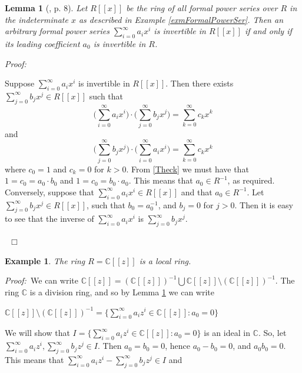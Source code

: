 \documentclass[12pt, oneside]{book}
\newtheorem{lemma}[theorem]{Lemma}
\newtheorem{example}[theorem]{Example}
\newcommand{\proof}{{\noindent \it Proof:~}}
\newcommand{\qed}{\hfill ~$\Box$\\}
\begin{document}
\begin{lemma}[\cite{L1}, p. 8] \label{leadingCoefficient}
\normalfont
\noindent Let $R[[x]]$ be the ring of all formal power series over $R$ in the indeterminate $x$ as
described in Example \ref{exmFormalPowerSer}. Then an arbitrary formal power series 
$\displaystyle \sum_{i = 0}^{\infty} a_ix^i$ is invertible in $R[[x]]$ if and only if its 
leading coefficient $a_0$ is invertible in $R$. 
\end{lemma}

\proof \space  

\noindent Suppose $\displaystyle \sum_{i = 0}^{\infty} a_ix^i$ is invertible in $R[[x]]$. 
Then there exists $\displaystyle \sum_{j = 0}^{\infty} b_jx^j \in R[[x]]$ such that 
\begin{equation} \label{Invertible1}
\big(\displaystyle \sum_{i = 0}^{\infty} a_ix^i\big) \cdot 
\big( \displaystyle \sum_{j = 0}^{\infty} b_jx^j \big) = \displaystyle \sum_{k = 0}^{\infty} c_k x^k
\end{equation}
and
\begin{equation} \label{Invertible2}
\big(\displaystyle \sum_{j = 0}^{\infty} b_jx^j\big) \cdot 
\big( \displaystyle \sum_{i = 0}^{\infty} a_ix^i \big) = \displaystyle \sum_{k = 0}^{\infty} c_k x^k
\end{equation}
where $c_0 = 1$ and $c_k = 0$ for $k > 0.$ From \eqref{Theck} we must have that 
$1 = c_0 = a_0 \cdot b_0$ and $1 = c_0 = b_0 \cdot a_0$. This means that $a_0 \in R^{-1}$, as required.
\vskip 0.3cm
\noindent Conversely, suppose that $\displaystyle \sum_{i = 0}^{\infty} a_ix^i \in R[[x]]$ 
and that $a_0 \in R^{-1}$. Let $\displaystyle \sum_{j = 0}^{\infty} b_jx^j \in R[[x]]$, 
such that $b_0 = a_0^{-1}$, and $b_j = 0$ for $j > 0$. Then it is easy to see that the inverse of 
$\displaystyle \sum_{i = 0}^{\infty} a_ix^i$ is $\displaystyle \sum_{j = 0}^{\infty} b_jx^j$.

\qed

\begin{example}
\normalfont
\noindent The ring $R=\mathbb{C}[[z]]$ is a local ring.
\end{example}

\proof \space We can write $\mathbb{C}[[z]] = (\mathbb{C}[[z]])^{-1} \bigcup \mathbb{C}[[z]] 
\setminus (\mathbb{C}[[z]])^{-1}.$ The ring $\mathbb{C}$ is a division ring, and so by Lemma
\ref{leadingCoefficient} we can write 
\begin{center}
$\mathbb{C}[[z]] \setminus (\mathbb{C}[[z]])^{-1} 
= \Big\{ \displaystyle \sum_{i = 0}^{\infty} a_iz^i \in \mathbb{C}[[z]] : a_0 = 0 \Big\} $
\end{center}
\noindent We will show that 
$I =  \Big\{ \displaystyle \sum_{i = 0}^{\infty} a_iz^i \in \mathbb{C}[[z]] : a_0 = 0 \Big\} $ 
is an ideal in $\mathbb{C}$. So, let 
$\displaystyle \sum_{i = 0}^{\infty} a_iz^i, 
\displaystyle \sum_{j = 0}^{\infty} b_jz^j \in I$. 
Then $a_0 = b_0 = 0$, hence $a_0 - b_0 = 0$, and $a_0b_0 = 0$. This means that
$\displaystyle \sum_{i = 0}^{\infty} a_iz^i - \displaystyle \sum_{j = 0}^{\infty} b_jz^j \in I$
and 
\end{document}
